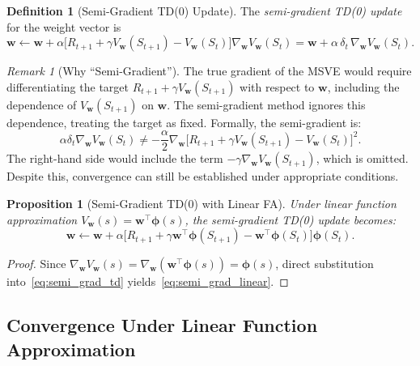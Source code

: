 \documentclass[11pt,a4paper]{article}
\theoremstyle{definition}
\newtheorem{definition}{Definition}[section]
\theoremstyle{plain}
\newtheorem{proposition}[theorem]{Proposition}
\theoremstyle{remark}
\newtheorem{remark}{Remark}[section]
\begin{document}
\begin{definition}[Semi-Gradient TD(0) Update]
\label{def:semi_grad_td}
The \emph{semi-gradient TD(0) update} for the weight vector is
\begin{equation}
    \bm{w} \leftarrow \bm{w} + \alpha\bigl[R_{t+1} + \gamma V_{\bm{w}}(S_{t+1}) - V_{\bm{w}}(S_t)\bigr]\nabla_{\bm{w}} V_{\bm{w}}(S_t)
    = \bm{w} + \alpha\,\delta_t\,\nabla_{\bm{w}} V_{\bm{w}}(S_t).
    \label{eq:semi_grad_td}
\end{equation}
\end{definition}

\begin{remark}[Why ``Semi-Gradient'']
\label{rem:semi_gradient}
The true gradient of the MSVE would require differentiating the target $R_{t+1} + \gamma V_{\bm{w}}(S_{t+1})$ with respect to $\bm{w}$, including the dependence of $V_{\bm{w}}(S_{t+1})$ on $\bm{w}$. The semi-gradient method ignores this dependence, treating the target as fixed. Formally, the semi-gradient is:
\begin{equation}
    \alpha\delta_t \nabla_{\bm{w}} V_{\bm{w}}(S_t) \neq -\frac{\alpha}{2}\nabla_{\bm{w}}\bigl[R_{t+1} + \gamma V_{\bm{w}}(S_{t+1}) - V_{\bm{w}}(S_t)\bigr]^2.
\end{equation}
The right-hand side would include the term $-\gamma\nabla_{\bm{w}} V_{\bm{w}}(S_{t+1})$, which is omitted. Despite this, convergence can still be established under appropriate conditions.
\end{remark}

\begin{proposition}[Semi-Gradient TD(0) with Linear FA]
\label{prop:semi_grad_linear}
Under linear function approximation $V_{\bm{w}}(s) = \bm{w}^\top \bm{\phi}(s)$, the semi-gradient TD(0) update becomes:
\begin{equation}
    \bm{w} \leftarrow \bm{w} + \alpha\bigl[R_{t+1} + \gamma \bm{w}^\top\bm{\phi}(S_{t+1}) - \bm{w}^\top\bm{\phi}(S_t)\bigr]\bm{\phi}(S_t).
    \label{eq:semi_grad_linear}
\end{equation}
\end{proposition}

\begin{proof}
Since $\nabla_{\bm{w}} V_{\bm{w}}(s) = \nabla_{\bm{w}}(\bm{w}^\top \bm{\phi}(s)) = \bm{\phi}(s)$, direct substitution into~\eqref{eq:semi_grad_td} yields~\eqref{eq:semi_grad_linear}.
\end{proof}

\subsection{Convergence Under Linear Function Approximation}
\label{subsec:fa_convergence}
\end{document}
